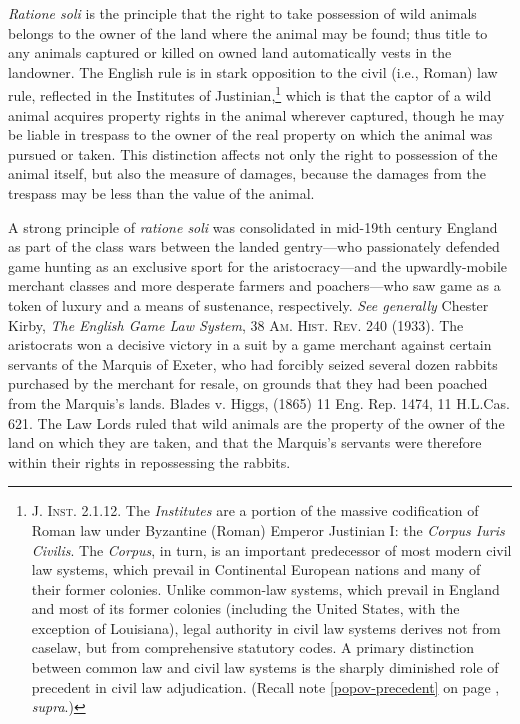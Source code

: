 

\textit{Ratione soli} is the principle that the right to take
possession of wild animals belongs to the owner of the land where the animal may
be found; thus title to any animals captured or killed on owned land
automatically vests in the landowner. The English rule is in stark opposition to
the civil (i.e., Roman) law rule, reflected in the Institutes of
Justinian,\footnote{\textsc{J. Inst.} 2.1.12. The \textit{Institutes} are a
portion of the massive codification of Roman law under Byzantine (Roman) Emperor
Justinian I: the \textit{Corpus Iuris Civilis}. The \textit{Corpus}, in turn, is
an important predecessor of most modern civil law systems, which prevail in
Continental European nations and many of their former colonies. Unlike
common-law systems, which prevail in England and most of its former colonies
(including the United States, with the exception of Louisiana), legal authority
in civil law systems derives not from caselaw, but from comprehensive statutory
codes. A primary distinction between common law and civil law systems is the
sharply diminished role of precedent in civil law adjudication. (Recall note
\ref{popov-precedent} on page \pageref{popov-precedent}, \textit{supra}.)}
which is that the captor of a wild animal acquires property rights in the animal
wherever captured, though he may be liable in trespass to the owner of the real
property on which the animal was pursued or taken. This distinction affects not
only the right to possession of the animal itself, but also the measure of
damages, because the damages from the trespass may be less than the value of the
animal.

A strong principle of \textit{ratione soli} was consolidated in mid-19th century
England as part of the class wars between the landed gentry---who passionately
defended game hunting as an exclusive sport for the aristocracy---and the
upwardly-mobile merchant classes and more desperate farmers and poachers---who
saw game as a token of luxury and a means of sustenance, respectively.
\textit{See generally} Chester Kirby, \emph{The English Game Law System}, 38
\textsc{Am. Hist. Rev.} 240 (1933). The aristocrats won a decisive victory in a
suit by a game merchant against certain servants of the Marquis of Exeter, who
had forcibly seized several dozen rabbits purchased by the merchant for resale,
on grounds that they had been poached from the Marquis's lands. Blades v. Higgs,
(1865) 11 Eng. Rep. 1474, 11 H.L.Cas. 621. The Law Lords ruled that wild animals
are the property of the owner of the land on which they are taken, and that the
Marquis's servants were therefore within their rights in repossessing the
rabbits.

